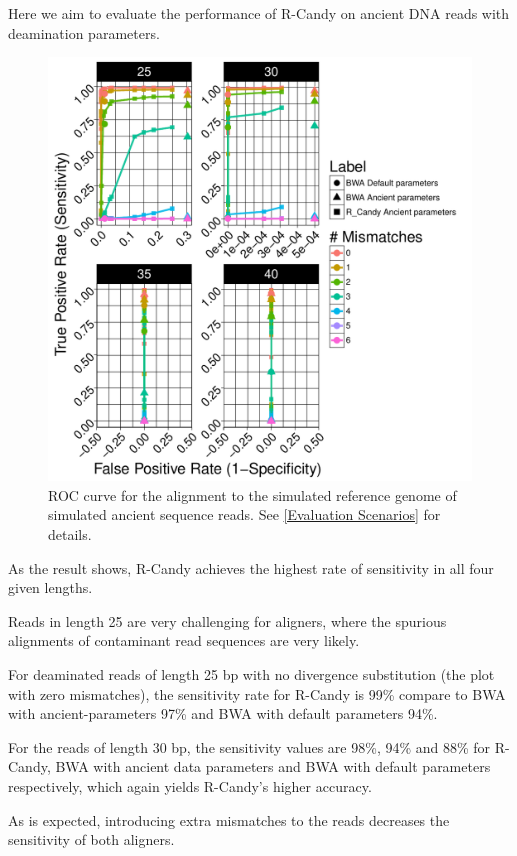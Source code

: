 \documentclass[11pt,a4paper]{report}
\begin{document}
Here we aim to evaluate the performance of R-Candy on ancient DNA reads
with deamination parameters.


\begin{figure}[H]
\centering
\includegraphics[width=12cm]{pictures/bROC_DS1_emp.pdf}

\caption{
ROC curve for the alignment to the simulated reference genome of simulated ancient
sequence reads. See \ref{Evaluation Scenarios} for details.}
\label{DS1_emp}
\end{figure}


As the result shows, R-Candy achieves the highest rate of sensitivity
in all four given lengths.

Reads in length 25 are very challenging for aligners, where
the spurious alignments of contaminant read sequences are very likely.

For deaminated reads of length 25 bp with no divergence substitution 
(the plot with zero mismatches), the sensitivity rate for R-Candy is 99\% 
compare to BWA with ancient-parameters 97\% and BWA with default parameters 94\%. 


For the reads of length 30 bp, the sensitivity values are 98\%, 94\% 
and 88\% for R-Candy, BWA with ancient data parameters and BWA with 
default parameters respectively, which again yields R-Candy's higher
accuracy.

As is expected, introducing extra mismatches to the reads decreases  
the sensitivity of both aligners.
\end{document}
